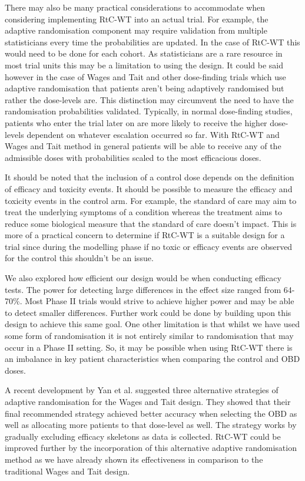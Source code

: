 There may also be many practical considerations to accommodate when considering implementing RtC-WT into an actual trial. For example, the adaptive randomisation component may require validation from multiple statisticians every time the probabilities are updated. In the case of RtC-WT this would need to be done for each cohort. As statisticians are a rare resource in most trial units this may be a limitation to using the design. It could be said however in the case of Wages and Tait and other dose-finding trials which use adaptive randomisation that patients aren't being adaptively randomised but rather the dose-levels are. This distinction may circumvent the need to have the randomisation probabilities validated. Typically, in normal dose-finding studies, patients who enter the trial later on are more likely to receive the higher dose-levels dependent on whatever escalation occurred so far. With RtC-WT and Wages and Tait method in general patients will be able to receive any of the admissible doses with probabilities scaled to the most efficacious doses.   

It should be noted that the inclusion of a control dose depends on the definition of efficacy and toxicity events. It should be possible to measure the efficacy and toxicity events in the control arm. For example, the standard of care may aim to treat the underlying symptoms of a condition whereas the treatment aims to reduce some biological measure that the standard of care doesn't impact. This is more of a practical concern to determine if RtC-WT is a suitable design for a trial since during the modelling phase if no toxic or efficacy events are observed for the control this shouldn't be an issue. 

We also explored how efficient our design would be when conducting efficacy tests. The power for detecting large differences in the effect size ranged from 64-70\%. Most Phase \RN{2} trials would strive to achieve higher power and may be able to detect smaller differences. Further work could be done by building upon this design to achieve this same goal. One other limitation is that whilst we have used some form of randomisation it is not entirely similar to randomisation that may occur in a Phase \RN{2} setting. So, it may be possible when using RtC-WT there is an imbalance in key patient characteristics when comparing the control and OBD doses.  

A recent development by Yan et al. \cite{yanImprovedAdaptiveRandomization2019} suggested three alternative strategies of adaptive randomisation for the Wages and Tait design. They showed that their final recommended strategy achieved better accuracy when selecting the OBD as well as allocating more patients to that dose-level as well. The strategy works by gradually excluding efficacy skeletons as data is collected. RtC-WT could be improved further by the incorporation of this alternative adaptive randomisation method as we have already shown its effectiveness in comparison to the traditional Wages and Tait design.  

